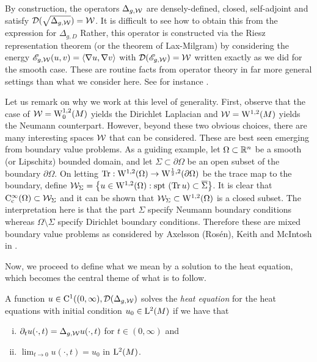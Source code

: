 \documentclass[a4paper, 12pt]{amsart}
\begin{document}
By construction, the  operators $\Delta_{g,\cW}$ 
are densely-defined, closed, self-adjoint and satisfy 
$\dom(\sqrt{\Delta_{g,\cW}}) = \cW$.
It is difficult to see how to obtain this from the expression for $\Delta_{g,D}$
Rather, this operator is constructed via the Riesz representation
theorem (or the theorem of Lax-Milgram) by considering the
energy $\sE_{g,\cW}(u,v) = \inprod{\nabla u, \nabla v}$ 
with $\dom(\sE_{g,\cW}) = \cW$ written exactly as we did for the smooth case.
These are routine facts from operator theory in far more general 
settings than what we consider here. See for instance 
\cite{Yosida, Kato}.

Let us remark on why we work at this level 
of generality. First, observe that the case of $\cW = \SobH[0]{1}(M)$
yields the Dirichlet Laplacian
and $\cW = \SobH{1}(M)$ yields the Neumann counterpart.
However, beyond these two obvious choices, 
there are many interesting spaces $\cW$ that
can be considered. These are best
seen emerging from boundary value problems.
As a guiding example, let $\Omega \subset \R^n$
be a smooth (or Lipschitz) bounded domain, and let $\Sigma \subset \partial \Omega$
be an open subset of the boundary $\partial \Omega$.
On letting $\Tr: \SobH{1}(\Omega) \to \SobH{\frac{1}{2}}(\partial \Omega)$
be the trace map to the boundary, define 
$\cW_{\Sigma} = \set{u \in \SobH{1}(\Omega): \spt (\Tr u) \subset \close{\Sigma}}$. 
It is clear that $\Ck[c]{\infty}(\Omega) \subset \cW_{\Sigma}$ and
it can be shown that $\cW_{\Sigma} \subset \SobH{1}(\Omega)$
is a closed subset. 
The interpretation here is that the part $\Sigma$ 
specify Neumann boundary conditions whereas $\Omega \setminus \Sigma$
specify Dirichlet boundary conditions. Therefore
these are mixed boundary value problems as considered
by  Axelsson (Rosén), Keith and McIntosh in \cite{AKM2}.

Now, we proceed to define what we mean by a solution to the heat
equation, which becomes the central theme of what is to follow.

\begin{defn}
A function \(u \in \Ck{1}((0,\infty),  \dom(\Delta_{g,\cW})\) solves the \emph{heat equation} for 
the heat equations
with initial condition $u_0 \in \Lp{2}(M)$  if we have that
\begin{enumerate}[(i)]
\item  $\partial_t u (\cdot, t) = \Delta_{g,\cW} u(\cdot, t)$ for $t \in (0, \infty)$ and 
\item $\lim_{t \to 0} u(\cdot, t) = u_0$ in $\Lp{2}(M)$.
\end{enumerate}
\end{defn}
\end{document}
